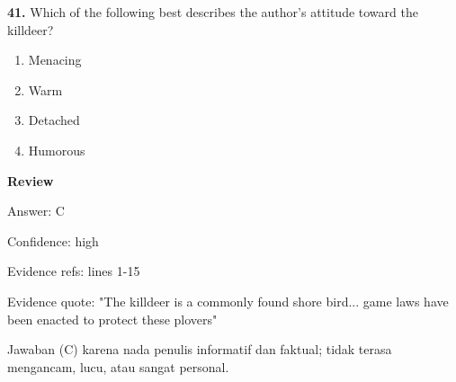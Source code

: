 \documentclass[12pt]{article}
\begin{document}
\endgroup
\par
\vspace{0.25\baselineskip}
\noindent\textbf{41.} Which of the following best describes the author's attitude toward the killdeer?
\begin{enumerate}[label=(\Alph*),leftmargin=*,itemsep=0.2em]
\item Menacing
\item Warm
\item Detached
\item Humorous
\end{enumerate}
\par
\begingroup
\setlength{\parskip}{0pt}
\setlength{\parindent}{0pt}
\textbf{Review}\par
Answer: C\par
Confidence: high\par
Evidence refs: lines 1-15\par
Evidence quote: "The killdeer is a commonly found shore bird... game laws have been enacted to protect these plovers"\par
Jawaban (C) karena nada penulis informatif dan faktual; tidak terasa mengancam, lucu, atau sangat personal.\par
\endgroup
\par
\vspace{0.25\baselineskip}
\end{document}
